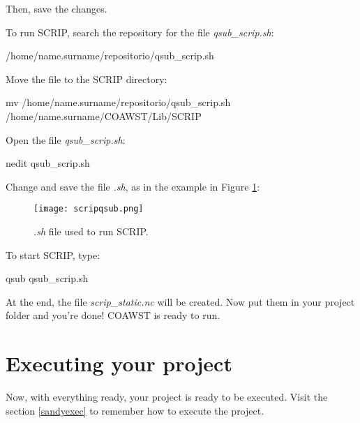 \noindent Then, save the changes.
\bigskip

\noindent To run SCRIP, search the repository for the file \textit{qsub\_scrip.sh}:
\bigskip

\begin{bashcode}
/home/name.surname/repositorio/qsub_scrip.sh
\end{bashcode}
\bigskip

\noindent Move the file to the SCRIP directory:
\bigskip

\begin{bashcode}[fontsize=\scriptsize]
mv /home/name.surname/repositorio/qsub_scrip.sh /home/name.surname/COAWST/Lib/SCRIP
\end{bashcode}
\bigskip

\noindent Open the file \textit{qsub\_scrip.sh}:
\bigskip

\begin{bashcode}
nedit qsub_scrip.sh
\end{bashcode}
\bigskip

\noindent Change and save the file \textit{.sh}, as in the example in Figure \textcolor{bleu_cite}{\ref{qsubscripsh}}:
\bigskip

\begin{figure}[H]
    \centering
    \texttt{[image: scripqsub.png]}
    \caption{\textit{.sh} file used to run SCRIP.}
    \label{qsubscripsh}
\end{figure}
\bigskip

\noindent To start SCRIP, type:
\bigskip

\begin{bashcode}
qsub qsub_scrip.sh
\end{bashcode}
\bigskip

\noindent At the end, the file \textit{scrip\_static.nc} will be created. Now put them in your project folder and you're done! COAWST is ready to run.
\bigskip

\section{Executing your project}{{{{ }}}}
\bigskip

\noindent Now, with everything ready, your project is ready to be executed. Visit the section \textcolor{bleu_cite}{\ref{sandyexec}} to remember 
how to execute the project.